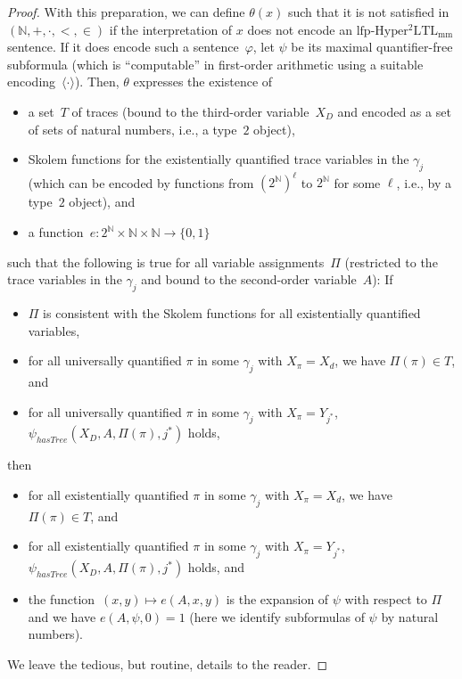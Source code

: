 \documentclass[dvipsnames,10pt,a4paper]{amsart}
\theoremstyle{definition}
\theoremstyle{remark}
\newcommand{\nats}{\mathbb{N}}
\renewcommand{\phi}{\varphi}
\newcommand{\pow}[1]{2^{#1}}
\newcommand{\set}[1]{\{#1\}}
\newcommand{\lfpsohyltlfp}{\mathrm{lfp\text{-}{Hyper^2LTL_{\mathrm{mm}}}}\xspace}
\newcommand{\unidisvar}{X_d}
\newcommand{\myquot}[1]{``#1''}
\newcommand{\natsstruct}{(\nats, +, \cdot, <, \in)}
\newcommand{\hastree}{\mathit{hasTree}}
\newcommand{\encode}[1]{\langle #1\rangle}
\begin{document}
\begin{proof}
With this preparation, we can define $\theta(x)$ such that it is not satisfied in $\natsstruct$ if the interpretation of $x$ does not encode an $\lfpsohyltlfp$ sentence.
If it does encode such a sentence~$\phi$, let $\psi$ be its maximal quantifier-free subformula (which is \myquot{computable} in first-order arithmetic using a suitable encoding~$\encode{\cdot}$).
Then, $\theta$ expresses the existence of
\begin{itemize}
    \item a set~$T$ of traces (bound to the third-order variable~$X_D$ and encoded as a set of sets of natural numbers, i.e., a type~$2$ object),
    \item Skolem functions for the existentially quantified trace variables in the $\gamma_j$ (which can be encoded by functions from $(\pow{\nats})^\ell$ to $\pow{\nats}$ for some $\ell$, i.e., by a type~$2$ object), and
    \item a function~$e \colon \pow{\nats} \times \nats \times \nats \rightarrow \set{0,1}$
\end{itemize}
such that the following is true for all variable assignments~$\Pi$ (restricted to the trace variables in the $\gamma_j$ and bound to the second-order variable~$A$):
If 
\begin{itemize}
    \item $\Pi$ is consistent with the Skolem functions for all existentially quantified variables,
    \item for all universally quantified $\pi$ in some $\gamma_j$ with $X_\pi = \unidisvar$, we have $\Pi(\pi) \in T$, and
    \item for all universally quantified $\pi$ in some $\gamma_j$ with $X_\pi = Y_{j^*}$, $\psi_{\hastree}(X_D,A, \Pi(\pi), j^*)$ holds, 
\end{itemize}
then
\begin{itemize}
    \item for all existentially quantified $\pi$ in some $\gamma_j$ with $X_\pi = \unidisvar$, we have $\Pi(\pi) \in T$, and
    \item for all existentially quantified $\pi$ in some $\gamma_j$ with $X_\pi = Y_{j^*}$, $\psi_{\hastree}(X_D,A, \Pi(\pi), j^*)$ holds, and
    \item the function~$(x,y)\mapsto e(A,x,y)$ is the expansion of $\psi$ with respect to $\Pi$ and we have $e(A,\psi,0) =1$ (here we identify subformulas of $\psi$ by natural numbers).
\end{itemize}
We leave the tedious, but routine, details to the reader. 
\end{proof}
\end{document}

